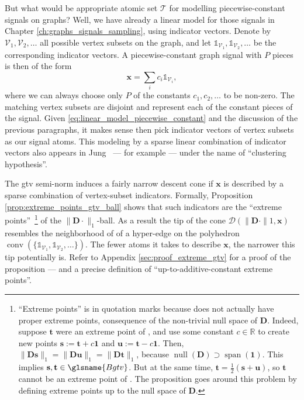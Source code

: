 But what would be appropriate atomic set $\mathcal{T}$ for modelling piecewise-constant signals on graphs? Well, we have already a linear model for those signals in Chapter \ref{ch:graphs_signals_sampling}, using indicator vectors. Denote by $\mathcal{V}_1, \mathcal{V}_2, \dots$ all possible vertex subsets on the graph, and let $\mathbb{1}_{\mathcal{V}_1}, \mathbb{1}_{\mathcal{V}_2}, \dots$ be the corresponding indicator vectors. A piecewise-constant graph signal with $P$ pieces is then of the form
\begin{equation}\label{eq:linear_model_piecewise_constant}
    \mathbf{x} = \sum_{i} c_i \mathbb{1}_{\mathcal{V}_i},
\end{equation}
where we can always choose only $P$ of the constants $c_1, c_2, \dots$ to be non-zero. The matching vertex subsets are disjoint and represent each of the constant pieces of the signal. Given \eqref{eq:linear_model_piecewise_constant} and the discussion of the previous paragraphs, it makes sense then pick indicator vectors of vertex subsets as our signal atoms. This modeling by a sparse linear combination of indicator vectors also appears in Jung~\cite{jung2018} --- for example --- under the name of ``clustering hypothesis''.

The \acrshort{gtv} semi-norm induces a fairly narrow descent cone if $\mathbf{x}$ is described by a sparse combination of vertex-subset indicators. Formally, Proposition \ref{prop:extreme_points_gtv_ball} shows that such indicators are the ``extreme points''~\footnote{``Extreme points'' is in quotation marks because  does not actually have proper extreme points, consequence of the non-trivial null space of $\mathbf{D}$. Indeed, suppose $\mathbf{t}$ were an extreme point of , and use some constant $c \in \mathbb{R}$ to create new points $\mathbf{s} := \mathbf{t} + c\mathbf{1}$ and $\mathbf{u} := \mathbf{t} - c\mathbf{1}$. Then, $\|\mathbf{Ds}\|_1 = \|\mathbf{Du}\|_1 = \|\mathbf{Dt}\|_1$, because $\operatorname{null} \left ( \mathbf{D} \right) \supset \operatorname{span} \left ( \mathbf{1} \right )$. This implies $\mathbf{s,t} \in \glsname{Bgtv}$. But at the same time, $\mathbf{t} = \frac{1}{2} (\mathbf{s} + \mathbf{u})$, so $\mathbf{t}$ cannot be an extreme point of . The proposition goes around this problem by defining extreme points up to the null space of $\mathbf{D}$.} of the $\| \mathbf{D} \cdot \|_1$-ball. As a result the tip of the cone $\mathcal{D}(\|\mathbf{D} \cdot \|1, \mathbf{x})$ resembles the neighborhood of of a hyper-edge on the polyhedron $\operatorname{conv}(\{\mathbb{1}_{\mathcal{V}_1}, \mathbb{1}_{\mathcal{V}_2}, \dots\})$. The fewer atoms it takes to describe $\mathbf{x}$, the narrower this tip potentially is. Refer to Appendix \ref{sec:proof_extreme_gtv} for a proof of the proposition --- and a precise definition of ``up-to-additive-constant extreme points''.

